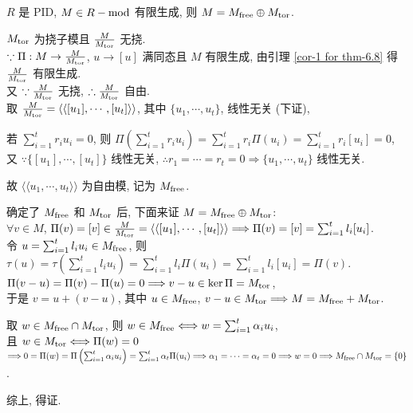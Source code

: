 \documentclass{note}
\begin{document}
\begin{thm}[(课本定理 6.8)]\label{thm-6.8}
    $R$ 是 PID, $M\in R-\operatorname{mod}$ 有限生成, 则 $M=M_{\operatorname{free}}\oplus M_{\operatorname{tor}}$.
\end{thm}
\begin{pf}
    $M_{\operatorname{tor}}$ 为挠子模且 $\frac{M}{M_{\operatorname{tor}}}$ 无挠.\\
    $\because\Pi:M\rightarrow\frac{M}{M_{\operatorname{tor}}}$, $u\rightarrow[u]$ 满同态且 $M$ 有限生成, 由引理 \ref{cor-1 for thm-6.8} 得 $\frac{M}{M_{\operatorname{tor}}}$ 有限生成.\\
    又 $\because\frac{M}{M_{\operatorname{tor}}}$ 无挠, $\therefore\frac{M}{M_{\operatorname{tor}}}$ 自由.\\
    取 $\frac{M}{M_{\operatorname{tor}}}=\langle\langle[u_1],\cdots,[u_t]\rangle\rangle$, 其中 $\{u_1,\cdots,u_t\}$, 线性无关 (下证),\\
    \begin{pf}
        若 $\sum_{i=1}^tr_iu_i=0$, 则 $\Pi\left(\sum_{i=1}^tr_iu_i\right)=\sum_{i=1}^tr_i\Pi(u_i)=\sum_{i=1}^tr_i[u_i]=0$,\\
        又 $\because\{[u_1],\cdots,[u_t]\}$ 线性无关, $\therefore r_1=\cdots=r_t=0\Longrightarrow\{u_1,\cdots,u_t\}$ 线性无关.
    \end{pf}
    故 $\langle\langle u_1,\cdots,u_t\rangle\rangle$ 为自由模, 记为 $M_{\operatorname{free}}$.

    确定了 $M_{\operatorname{free}}$ 和 $M_{\operatorname{tor}}$ 后, 下面来证 $M=M_{\operatorname{free}}\oplus M_{\operatorname{tor}}$:\\
    $\forall v\in M$, $\Pi(v)=[v]\in\frac{M}{M_{\operatorname{tor}}}=\langle\langle[u_1],\cdots,[u_t]\rangle\rangle\Longrightarrow\Pi(v)=[v]=\sum_{i=1}^tl_i[u_i]$.\\
    令 $u=\sum_{i=1}^tl_iu_i\in M_{\operatorname{free}}$, 则 $\tau(u)=\tau\left(\sum_{i=1}^tl_iu_i\right)=\sum_{i=1}^tl_i\Pi(u_i)=\sum_{i=1}^tl_i[u_i]=\Pi(v)$.\\
    $\Pi(v-u)=\Pi(v)-\Pi(u)=0\Longrightarrow v-u\in\ker\Pi=M_{\operatorname{tor}}$,\\
    于是 $v=u+(v-u)$, 其中 $u\in M_{\operatorname{free}}$, $v-u\in M_{\operatorname{tor}}\Longrightarrow M=M_{\operatorname{free}}+M_{\operatorname{tor}}$.

    取 $w\in M_{\operatorname{free}}\cap M_{\operatorname{tor}}$, 则 $w\in M_{\operatorname{free}}\Longleftrightarrow w=\sum_{i=1}^t\alpha_iu_i$,\\
    且 $w\in M_{\operatorname{tor}}\Longleftrightarrow\Pi(w)=0$\\
    $\Longrightarrow 0=\Pi(w)=\Pi\left(\sum_{i=1}^t\alpha_iu_i\right)=\sum_{i=1}^t\alpha_t\Pi(u_i)\Longrightarrow\alpha_1=\cdots=\alpha_t=0\Longrightarrow w=0\Longrightarrow M_{\operatorname{free}}\cap M_{\operatorname{tor}}=\{0\}$.

    综上, 得证.
\end{pf}
\end{document}
